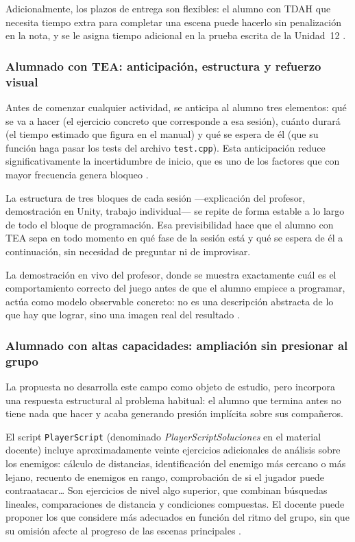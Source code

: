 \documentclass[a4paper,12pt]{article}
\begin{document}
Adicionalmente, los plazos de entrega son flexibles: el alumno con TDAH que necesita tiempo extra para completar una escena puede hacerlo sin penalización en la nota, y se le asigna tiempo adicional en la prueba escrita de la Unidad~12 \citep{dupaul2014adhd}.


\subsubsection*{Alumnado con TEA: anticipación, estructura y refuerzo visual}


Antes de comenzar cualquier actividad, se anticipa al alumno tres elementos: qué se va a hacer (el ejercicio concreto que corresponde a esa sesión), cuánto durará (el tiempo estimado que figura en el manual) y qué se espera de él (que su función haga pasar los tests del archivo \texttt{test.cpp}). Esta anticipación reduce significativamente la incertidumbre de inicio, que es uno de los factores que con mayor frecuencia genera bloqueo \citep{knight2015visual}.


La estructura de tres bloques de cada sesión ---explicación del profesor, demostración en Unity, trabajo individual--- se repite de forma estable a lo largo de todo el bloque de programación. Esa previsibilidad hace que el alumno con TEA sepa en todo momento en qué fase de la sesión está y qué se espera de él a continuación, sin necesidad de preguntar ni de improvisar.


La demostración en vivo del profesor, donde se muestra exactamente cuál es el comportamiento correcto del juego antes de que el alumno empiece a programar, actúa como modelo observable concreto: no es una descripción abstracta de lo que hay que lograr, sino una imagen real del resultado \citep{knight2015visual}.


\subsubsection*{Alumnado con altas capacidades: ampliación sin presionar al grupo}


La propuesta no desarrolla este campo como objeto de estudio, pero incorpora una respuesta estructural al problema habitual: el alumno que termina antes no tiene nada que hacer y acaba generando presión implícita sobre sus compañeros.


El script \texttt{PlayerScript} (denominado \textit{PlayerScriptSoluciones} en el material docente) incluye aproximadamente veinte ejercicios adicionales de análisis sobre los enemigos: cálculo de distancias, identificación del enemigo más cercano o más lejano, recuento de enemigos en rango, comprobación de si el jugador puede contraatacar\ldots{} Son ejercicios de nivel algo superior, que combinan búsquedas lineales, comparaciones de distancia y condiciones compuestas. El docente puede proponer los que considere más adecuados en función del ritmo del grupo, sin que su omisión afecte al progreso de las escenas principales \citep{steenbergenhu2016grouping}.
\end{document}
